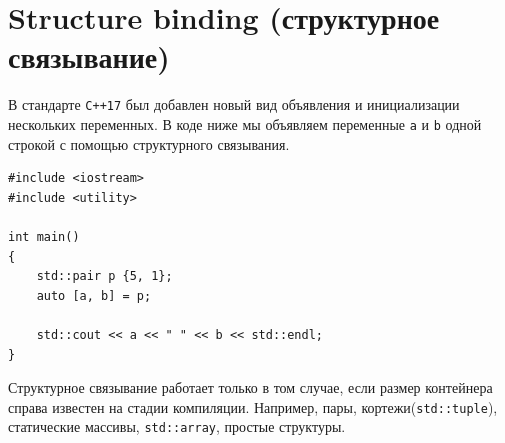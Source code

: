 \documentclass{article}
\begin{document}
\newpage
\section*{Structure binding (структурное связывание)}
В стандарте \texttt{C++17} был добавлен новый вид объявления и инициализации нескольких переменных. В коде ниже мы объявляем переменные \texttt{a} и \texttt{b} одной строкой с помощью структурного связывания.
\begin{lstlisting}
#include <iostream>
#include <utility>

int main() 
{
    std::pair p {5, 1};
    auto [a, b] = p;
    
    std::cout << a << " " << b << std::endl;
}
\end{lstlisting}
Структурное связывание работает только в том случае, если размер контейнера справа известен на стадии компиляции. Например, пары, кортежи(\texttt{std::tuple}), статические массивы, \texttt{std::array}, простые структуры.
\end{document}

